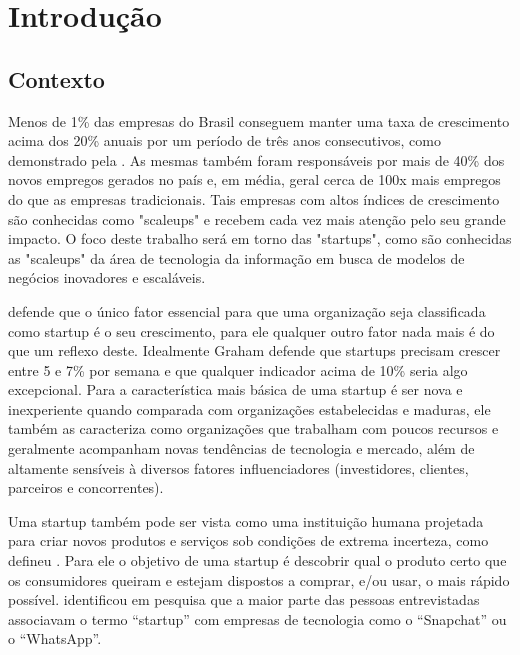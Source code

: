 \chapter{Introdução}
\label{cap-introducao}

\section{Contexto}
\label{section:contexto}

Menos de 1\% das empresas do Brasil conseguem manter uma taxa de crescimento acima dos 20\% anuais por um período de três anos consecutivos, como demonstrado pela . As mesmas também foram responsáveis por mais de 40\% dos novos empregos gerados no país e, em média, geral cerca de 100x mais empregos do que as empresas tradicionais. Tais empresas com altos índices de crescimento são conhecidas como "scaleups" e recebem cada vez mais atenção pelo seu grande impacto. O foco deste trabalho será em torno das "startups", como são conhecidas as "scaleups" da área de tecnologia da informação em busca de modelos de negócios inovadores e escaláveis.

 defende que o único fator essencial para que uma organização seja classificada como startup é o seu crescimento, para ele qualquer outro fator nada mais é do que um reflexo deste. Idealmente Graham defende que startups precisam crescer entre 5 e 7\% por semana e que qualquer indicador acima de 10\% seria algo excepcional. Para  a característica mais básica de uma startup é ser nova e inexperiente quando comparada com organizações estabelecidas e maduras, ele também as caracteriza como organizações que trabalham com poucos recursos e geralmente acompanham novas tendências de tecnologia e mercado, além de altamente sensíveis à diversos fatores influenciadores (investidores, clientes, parceiros e concorrentes).

Uma startup também pode ser vista como uma instituição humana projetada para criar novos produtos e serviços sob condições de extrema incerteza, como defineu . Para ele o objetivo de uma startup é descobrir qual o produto certo que os consumidores queiram e estejam dispostos a comprar, e/ou usar, o mais rápido possível.  identificou em pesquisa que a maior parte das pessoas entrevistadas associavam o termo ``startup'' com empresas de tecnologia como o ``Snapchat'' ou o ``WhatsApp''.

